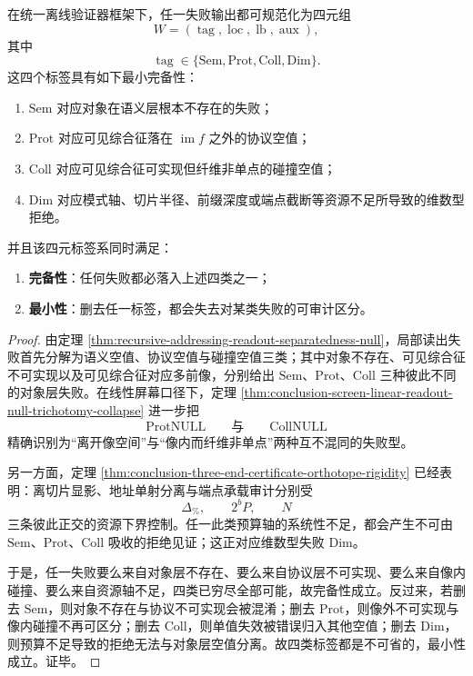 \begin{theorem}[离线失败语义的四元最小完备分类]\label{thm:conclusion-offline-failure-semantics-minimal-complete-quadriga}
在统一离线验证器框架下，任一失败输出都可规范化为四元组
\[
W=(\operatorname{tag},\operatorname{loc},\operatorname{lb},\operatorname{aux}),
\]
其中
\[
\operatorname{tag}\in\{\mathrm{Sem},\mathrm{Prot},\mathrm{Coll},\mathrm{Dim}\}.
\]
这四个标签具有如下最小完备性：
\begin{enumerate}
  \item \(\mathrm{Sem}\) 对应对象在语义层根本不存在的失败；
  \item \(\mathrm{Prot}\) 对应可见综合征落在 \(\operatorname{im}f\) 之外的协议空值；
  \item \(\mathrm{Coll}\) 对应可见综合征可实现但纤维非单点的碰撞空值；
  \item \(\mathrm{Dim}\) 对应模式轴、切片半径、前缀深度或端点截断等资源不足所导致的维数型拒绝。
\end{enumerate}
并且该四元标签系同时满足：
\begin{enumerate}
  \item \textbf{完备性}：任何失败都必落入上述四类之一；
  \item \textbf{最小性}：删去任一标签，都会失去对某类失败的可审计区分。
\end{enumerate}
\end{theorem}
\begin{proof}
由定理 \ref{thm:recursive-addressing-readout-separatedness-null}，局部读出失败首先分解为语义空值、协议空值与碰撞空值三类；其中对象不存在、可见综合征不可实现以及可见综合征对应多前像，分别给出 \(\mathrm{Sem}\)、\(\mathrm{Prot}\)、\(\mathrm{Coll}\) 三种彼此不同的对象层失败。在线性屏幕口径下，定理 \ref{thm:conclusion-screen-linear-readout-null-trichotomy-collapse} 进一步把
\[
\mathrm{ProtNULL}
\qquad\text{与}\qquad
\mathrm{CollNULL}
\]
精确识别为“离开像空间”与“像内而纤维非单点”两种互不混同的失败型。

另一方面，定理 \ref{thm:conclusion-three-end-certificate-orthotope-rigidity} 已经表明：离切片显影、地址单射分离与端点承载审计分别受
\[
\Delta_{\%},\qquad 2^bP,\qquad N
\]
三条彼此正交的资源下界控制。任一此类预算轴的系统性不足，都会产生不可由 \(\mathrm{Sem}\)、\(\mathrm{Prot}\)、\(\mathrm{Coll}\) 吸收的拒绝见证；这正对应维数型失败 \(\mathrm{Dim}\)。

于是，任一失败要么来自对象层不存在、要么来自协议层不可实现、要么来自像内碰撞、要么来自资源轴不足，四类已穷尽全部可能，故完备性成立。反过来，若删去 \(\mathrm{Sem}\)，则对象不存在与协议不可实现会被混淆；删去 \(\mathrm{Prot}\)，则像外不可实现与像内碰撞不再可区分；删去 \(\mathrm{Coll}\)，则单值失效被错误归入其他空值；删去 \(\mathrm{Dim}\)，则预算不足导致的拒绝无法与对象层空值分离。故四类标签都是不可省的，最小性成立。证毕。
\end{proof}

